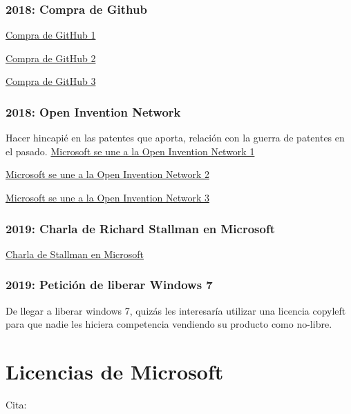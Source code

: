 \documentclass[10pt, titlepage]{article}
\begin{document}
\subsubsection{2018: Compra de Github}
\href{https://www.xataka.com/aplicaciones/oficial-microsoft-compra-github-7-500-millones-dolares}{Compra de GitHub 1}

\href{https://www.elconfidencial.com/tecnologia/2018-06-04/microsoft-ahora-ama-el-software-libre-compra-la-startup-github-por-7-500-millones_1573704/}{Compra de GitHub 2}

\href{https://www.xataka.com/aplicaciones/microsoft-punto-adquirir-github-desarrolladores-desarrolladores-desarrolladores}{Compra de GitHub 3}

\subsubsection{2018: Open Invention Network}
Hacer hincapié en las patentes que aporta, relación con la guerra de patentes en el pasado.
\href{https://azure.microsoft.com/en-us/blog/microsoft-joins-open-invention-network-to-help-protect-linux-and-open-source/}{Microsoft se une a la Open Invention Network 1}

\href{https://www.zdnet.com/article/what-does-microsoft-joining-the-open-invention-network-mean-for-you/}{Microsoft se une a la Open Invention Network 2}

\href{https://www.muycomputerpro.com/2018/10/10/microsoft-se-une-a-open-invention-network}{Microsoft se une a la Open Invention Network 3}

\subsubsection{2019: Charla de Richard Stallman en Microsoft}
\href{https://stallman.org/articles/microsoft-talk.html}{Charla de Stallman en Microsoft}

\subsubsection{2019: Petición de liberar Windows 7}
De llegar a liberar windows 7, quizás les interesaría utilizar una licencia copyleft para que nadie les hiciera competencia vendiendo su producto como no-libre.

\section{Licencias de Microsoft}
Cita: \cite{desde_linux_2020}
\end{document}
